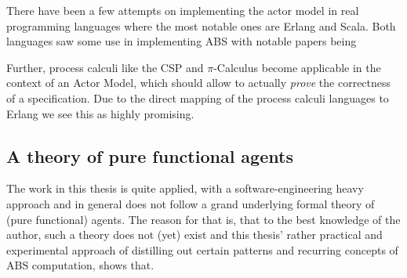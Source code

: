 There have been a few attempts on implementing the actor model in real programming languages where the most notable ones are Erlang and Scala. Both languages saw some use in implementing ABS with notable papers being \cite{bezirgiannis_improving_2013,di_stefano_using_2005, di_stefano_exat:_2007,  sher_agent-based_2013, varela_modelling_2004}



Further, process calculi like the CSP \cite{hoare_communicating_1985} and $\pi$-Calculus \cite{milner_communicating_1999} become applicable in the context of an Actor Model, which should allow to actually \textit{prove} the correctness of a specification. Due to the direct mapping of the process calculi languages to Erlang we see this as highly promising.


\subsection{A theory of pure functional agents}
The work in this thesis is quite applied, with a software-engineering heavy approach and in general does not follow a grand underlying formal theory of (pure functional) agents. The reason for that is, that to the best knowledge of the author, such a theory does not (yet) exist and this thesis' rather practical and experimental approach of distilling out certain patterns and recurring concepts of ABS computation, shows that.

